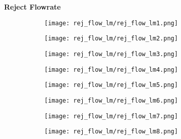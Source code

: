 \documentclass{article}
\begin{document}
    \textbf{Reject Flowrate}
    \begin{figure}[H]
        \centering
        \begin{subfigure}{0.48\linewidth}
		    \texttt{[image: rej\_flow\_lm/rej\_flow\_lm1.png]}
	    \end{subfigure}
	    \begin{subfigure}{0.48\linewidth}
		    \texttt{[image: rej\_flow\_lm/rej\_flow\_lm2.png]}
	    \end{subfigure}
	    \begin{subfigure}{0.48\linewidth}
		    \texttt{[image: rej\_flow\_lm/rej\_flow\_lm3.png]}
	    \end{subfigure}
	    \begin{subfigure}{0.48\linewidth}
		    \texttt{[image: rej\_flow\_lm/rej\_flow\_lm4.png]}
	    \end{subfigure}
	    \begin{subfigure}{0.48\linewidth}
		    \texttt{[image: rej\_flow\_lm/rej\_flow\_lm5.png]}
	    \end{subfigure}
	    \begin{subfigure}{0.48\linewidth}
		    \texttt{[image: rej\_flow\_lm/rej\_flow\_lm6.png]}
	    \end{subfigure}
	    \begin{subfigure}{0.48\linewidth}
		    \texttt{[image: rej\_flow\_lm/rej\_flow\_lm7.png]}
	    \end{subfigure}
	    \begin{subfigure}{0.48\linewidth}
		    \texttt{[image: rej\_flow\_lm/rej\_flow\_lm8.png]}
	    \end{subfigure}
    \end{figure}
    
    \pagebreak
    
\end{document}
